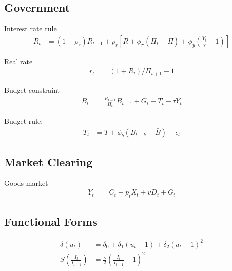 \documentclass[11pt]{article}
\begin{document}



\subsection{Government}

Interest rate rule
\begin{align*}
	R_t &= (1-\rho_r)R_{t-1} + \rho_r\left[R + \phi_\pi(\Pi_t-\bar{\Pi}) + \phi_y\left(\frac{Y_t}{\bar{Y}}-1\right)\right]
\end{align*}

Real rate
\begin{align*}
	r_t &= (1+R_t)/\Pi_{t+1} - 1
\end{align*}

Budget constraint
\begin{align*}
	B_t &= \frac{R_{t-1}}{\Pi_t}B_{t-1} + G_t - T_t - \tau Y_t
\end{align*}


Budget rule:
\begin{align*}
	T_t &= T + \phi_b(B_{t-k}-\bar{B}) - \epsilon_t
\end{align*}


\subsection{Market Clearing}

Goods market
\begin{align*}
	Y_t &= C_t + p_t X_t + vD_t + G_t
\end{align*}


\subsection{Functional Forms}

\begin{align*}
	\delta(u_t) &= \delta_0 + \delta_1 (u_t-1) + \delta_2 (u_t-1)^2 \\
	S\left(\frac{I_t}{I_{t-1}}\right) &=\frac{\kappa}{2}\left(\frac{I_t}{I_{t-1}}-1\right)^{2}
\end{align*}
\end{document}
